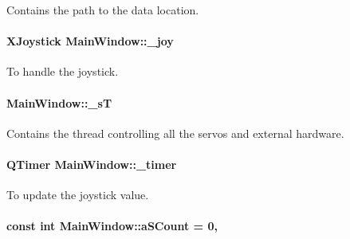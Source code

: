 Contains the path to the data location. 

\hypertarget{a00005_a671f35800890e518713e1946671d8730}{}
\paragraph[{\+\_\+joy}]{\setlength{\rightskip}{0pt plus 5cm}X\+Joystick Main\+Window\+::\+\_\+joy\hspace{0.3cm}{\ttfamily [private]}}\label{a00005_a671f35800890e518713e1946671d8730}


To handle the joystick. 

\hypertarget{a00005_a97f8ecc7ecb930b796178cef7b975013}{}
\paragraph[{\+\_\+s\+T}]{ Main\+Window\+::\+\_\+s\+T\hspace{0.3cm}{\ttfamily [private]}}\label{a00005_a97f8ecc7ecb930b796178cef7b975013}


Contains the thread controlling all the servos and external hardware. 

\hypertarget{a00005_a254b03b878cfda75c1c411a2f8568d33}{}
\paragraph[{\+\_\+timer}]{\setlength{\rightskip}{0pt plus 5cm}Q\+Timer Main\+Window\+::\+\_\+timer\hspace{0.3cm}{\ttfamily [private]}}\label{a00005_a254b03b878cfda75c1c411a2f8568d33}


To update the joystick value. 

\hypertarget{a00005_a42c44af9c0eebc33f4e81f02e15b0461}{}
\paragraph[{a\+S\+Count}]{\setlength{\rightskip}{0pt plus 5cm}const int Main\+Window\+::a\+S\+Count = 0\hspace{0.3cm}{\ttfamily [static]}, {\ttfamily [private]}}\label{a00005_a42c44af9c0eebc33f4e81f02e15b0461}


